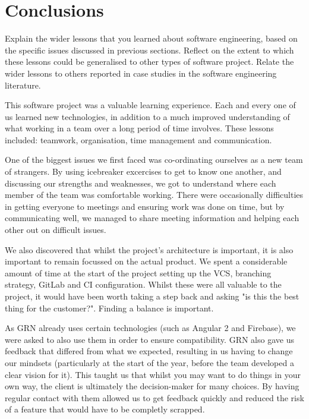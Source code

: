 \documentclass{l3proj}
\begin{document}
\section{Conclusions} %
\label{sec:conclusion}

Explain the wider lessons that you learned about software engineering,
based on the specific issues discussed in previous sections.  Reflect
on the extent to which these lessons could be generalised to other
types of software project.  Relate the wider lessons to others
reported in case studies in the software engineering literature.


This software project was a valuable learning experience. Each and every one of
 us learned new technologies, in addition to a much improved understanding
 of what working in a team over a long period of time involves. These lessons
 included: teamwork, organisation, time management and communication.
 
One of the biggest issues we first faced was co-ordinating ourselves as a 
 new team of strangers. By using icebreaker excercises to get to know 
 one another, and discussing our strengths and weaknesses, we got to 
 understand where each member of the team was comfortable working. There
 were occasionally difficulties in getting everyone to meetings and ensuring
 work was done on time, but by communicating well, we managed to share
 meeting information and helping each other out on difficult issues.
 
We also discovered that whilst the project's architecture is important, 
 it is also important to remain focussed on the actual product. We 
 spent a considerable amount of time at the start of the project setting 
 up the VCS, branching strategy, GitLab and CI configuration. Whilst these
 were all valuable to the project, it would have been worth taking a step
 back and asking "is this the best thing for the customer?". Finding a balance
 is important.
 
As GRN already uses certain technologies (such as Angular 2 and Firebase),
 we were asked to also use them in order to ensure compatibility. GRN also
 gave us feedback that differed from what we expected, resulting in us 
 having to change our mindsets (particularly at the start of the year,
 before the team developed a clear vision for it). This taught us that 
 whilst you may want to do things in your own way, the client is ultimately
 the decision-maker for many choices. By having regular contact with them
 allowed us to get feedback quickly and reduced the risk of a feature that
 would have to be completly scrapped.
 
\end{document}
